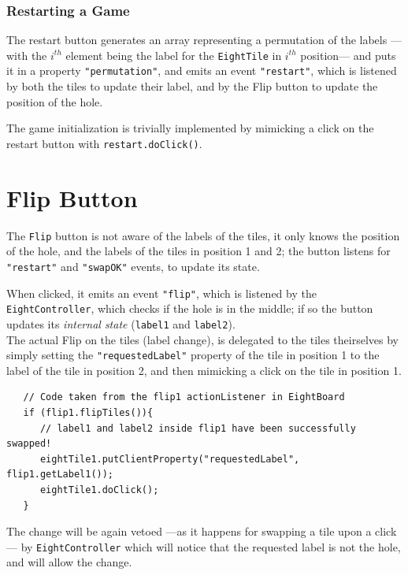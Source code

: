 \subsubsection{Restarting a Game}
The restart button generates an array representing a permutation of the labels ---with the $i^{th}$ element being the label for the \lstinline|EightTile| in $i^{th}$ position--- and puts it in a property \lstinline|"permutation"|, and emits an event \lstinline|"restart"|, which is listened by both the tiles to update their label, and by the Flip button to update the position of the hole.

The game initialization is trivially implemented by mimicking a click on the restart button with \lstinline|restart.doClick()|. 
\newpage

\section{Flip Button}

The \lstinline|Flip| button is not aware of the labels of the tiles, it only knows the position of the hole, and the labels of the tiles in position 1 and 2; the button listens for \lstinline|"restart"| and \lstinline|"swapOK"| events, to update its state.

When clicked, it emits an event \lstinline|"flip"|, which is listened by the \lstinline|EightController|, which checks if the hole is in the middle; if so the button updates its \textit{internal state} (\lstinline|label1| and \lstinline|label2|).\\
The actual Flip on the tiles (label change), is delegated to the tiles theirselves by simply setting the \lstinline|"requestedLabel"| property of the tile in position 1 to the label of the tile in position 2, and then mimicking a click on the tile in position 1.

\begin{lstlisting}
   // Code taken from the flip1 actionListener in EightBoard
   if (flip1.flipTiles()){
      // label1 and label2 inside flip1 have been successfully swapped!
      eightTile1.putClientProperty("requestedLabel", flip1.getLabel1());
      eightTile1.doClick();
   }
\end{lstlisting}

The change will be again vetoed ---as it happens for swapping a tile upon a click--- by \lstinline|EightController| which will notice that the requested label is not the hole, and will allow the change.
